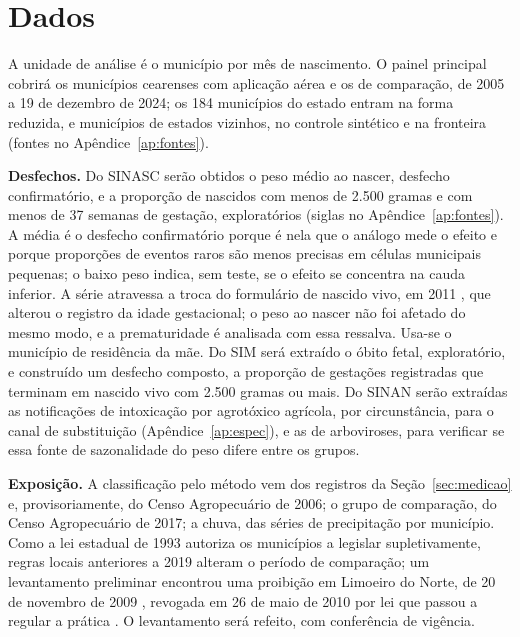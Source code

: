 
\chapter{Dados}
\label{cap:dados}

A unidade de análise é o município por mês de nascimento. O painel principal
cobrirá os municípios cearenses com aplicação aérea e os de comparação, de 2005
a 19 de dezembro de 2024; os 184 municípios do estado entram na forma reduzida,
e municípios de estados vizinhos, no controle sintético e na fronteira
(fontes no Apêndice~\ref{ap:fontes}).

\textbf{Desfechos.} Do SINASC serão obtidos o peso médio ao nascer, desfecho
confirmatório, e a proporção de nascidos com menos de 2.500 gramas e com menos
de 37 semanas de gestação, exploratórios (siglas no
Apêndice~\ref{ap:fontes}). A média é o desfecho confirmatório porque é nela
que o análogo mede o efeito e porque proporções de eventos raros são menos
precisas em células municipais pequenas; o baixo peso indica, sem teste, se o
efeito se concentra na cauda inferior. A série atravessa a troca do formulário de nascido vivo, em 2011
\cite{brasil2011sinasc}, que alterou o registro da idade gestacional; o peso ao
nascer não foi afetado do mesmo modo, e a prematuridade é analisada com essa
ressalva. Usa-se o município de residência da mãe. Do SIM será extraído o óbito
fetal, exploratório, e construído um desfecho composto, a proporção de
gestações registradas que terminam em nascido vivo com 2.500 gramas ou mais.
Do SINAN serão extraídas as notificações de intoxicação por agrotóxico
agrícola, por circunstância, para o canal de substituição
(Apêndice~\ref{ap:espec}), e as de arboviroses, para verificar se essa fonte
de sazonalidade do peso difere entre os grupos.

\textbf{Exposição.} A classificação pelo método vem dos registros da
Seção~\ref{sec:medicao} e, provisoriamente, do Censo Agropecuário de 2006; o
grupo de comparação, do Censo Agropecuário de 2017; a chuva, das séries de
precipitação por município. Como a lei estadual de 1993 autoriza os municípios
a legislar supletivamente, regras locais anteriores a 2019 alteram o período
de comparação; um levantamento preliminar encontrou uma proibição em Limoeiro
do Norte, de 20 de novembro de 2009 \cite{limoeiro2009lei1478}, revogada em 26
de maio de 2010 por lei que passou a regular a prática
\cite{limoeiro2010lei1511}. O levantamento será refeito, com conferência de
vigência.

